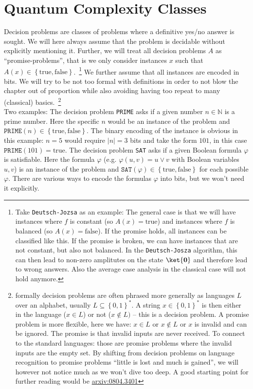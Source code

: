 \section{Quantum Complexity Classes}

Decision problems are classes of problems where a definitive yes/no answer is sought. We will here always assume that the problem is decidable without explicitly mentioning it. 
Further, we will treat all decision problems $A$ as ``promise-problems'', that is we only consider instances $x$ such that $A(x) \in \left\{ \text{true},\text{false} \right\}$.~\footnote{Take \texttt{Deutsch-Jozsa} as an example: The general case is that we will have instances where $f$ is constant (so $A(x)=\text{true}$) and instances where $f$ is balanced (so $A(x)=\text{false}$). If the promise holds, all instances can be classified like this. If the promise is broken, we can have instances that are not constant, but also not balanced. In the \texttt{Deutsch-Josza} algorithm, this can then lead to non-zero amplitutes on the state $\ket{\mathbf{0}}$ and therefore lead to wrong answers. Also the average case analysis in the classical case will not hold anymore.} We further assume that all instances are encoded in bits. We will try to be not too formal with definitions in order to not blow the chapter out of proportion while also avoiding having too repeat to many (classical) basics.~\footnote{formally decision problems are often phrased more generally as languages $L$ over an alphabet, usually $L\subseteq \left\{0,1\right\}^*$. A string $x\in\left\{0,1\right\}^*$ is then either in the language ($x\in L$) or not ($x\notin L)$ -- this is a decision problem.
A promise problem is more flexible, here we have: $x\in L$ or $x\notin L$ or $x$ is invalid and can be ignored. The promise is that invalid inputs are never received. To connect to the standard languages: those are promise problems where the invalid inputs are the empty set. By shifting from decision problems on language recognition to promise problems ``little is lost and much is gained'', we will however not notice much as we won't dive too deep. A good starting point for further reading would be \href{https://arxiv.org/abs/0804.3401}{arxiv:0804.3401} }\\

Two examples: The decision problem \texttt{PRIME} asks if a given number $n\in \mathbb
N$ is a prime number. Here the specific $n$ would be an instance of the problem and $\texttt{PRIME}(n) \in \left\{\text{true},\text{false}\right\}$. The binary encoding of the instance is obvious in this example: $n=5$ would require $|n|=3$ bits and take the form $101$, in this case $\texttt{PRIME}(101)=\text{true}$. The decision problem \texttt{SAT} asks if a given Boolean formula $\varphi$ is satisfiable. Here the formula $\varphi$ (e.g. $\varphi(u,v) = u \vee v $ with Boolean variables $u,v$) is an instance of the problem and $\texttt{SAT}(\varphi) \in \left\{ \text{true}, \text{false}\right\}$ for each possible $\varphi$. There are various ways to encode the formulas $\varphi$ into bits, but we won't need it explicitly.\\

